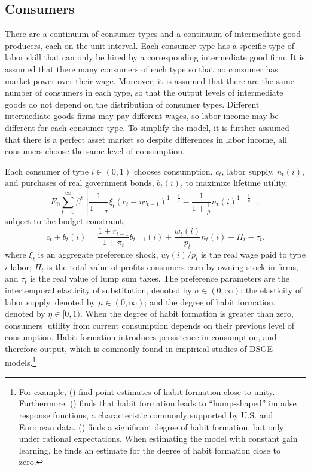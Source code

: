 \documentclass[12pt]{article}
\newcommand{\beq}{\begin{equation}}
\newcommand{\eeq}{\end{equation}}
\newcommand{\citee}[1]{\citename{#1} (\citeyear{#1})}
\begin{document}
\subsection{Consumers}
There are a continuum of consumer types and a continuum of intermediate good producers, each on the unit interval.  Each consumer type has a specific type of labor skill that can only be hired by a corresponding intermediate good firm.  It is assumed that there many consumers of each type so that no consumer has market power over their wage.  Moreover, it is assumed that there are the same number of consumers in each type, so that the output levels of intermediate goods do not depend on the distribution of consumer types.  Different intermediate goods firms may pay different wages, so labor income may be different for each consumer type.  To simplify the model, it is further assumed that there is a perfect asset market so despite differences in labor income, all consumers choose the same level of consumption.

Each consumer of type $i\in(0,1)$ chooses consumption, $c_t$, labor supply, $n_t(i)$, and purchases of real government bonds, $b_{t}(i)$, to maximize lifetime utility,
\beq \label{eq:util} E_0 \sum_{t=0}^{\infty} \beta^t \left[ \frac{1}{1-\frac{1}{\sigma}} \xi_t \left(c_t - \eta c_{t-1}\right)^{1-\frac{1}{\sigma}} - \frac{1}{1+\frac{1}{\mu}} n_t(i)^{1+\frac{1}{\mu}} \right], \eeq
subject to the budget constraint, 
\beq \label{eq:bc} c_t + b_t(i) = \frac{1+r_{t-1}}{1+\pi_t} b_{t-1}(i) + \frac{w_t(i)}{p_t} n_t(i) + \Pi_t - \tau_t. \eeq
where $\xi_t$ is an aggregate preference shock, $w_t(i)/p_t$ is the real wage paid to type $i$ labor; $\Pi_t$ is the total value of profits consumers earn by owning stock in firms, and $\tau_t$ is the real value of lump sum taxes.  The preference parameters are the intertemporal elasticity of substitution, denoted by $\sigma \in (0,\infty)$; the elasticity of labor supply, denoted by $\mu \in (0, \infty)$; and the degree of habit formation, denoted by $\eta \in [0,1)$.  When the degree of habit formation is greater than zero, consumers' utility from current consumption depends on their previous level of consumption.  Habit formation introduces persistence in consumption, and therefore output, which is commonly found in empirical studies of DSGE models.\footnote{For example, \citee{smetswouters2005} find point estimates of habit formation close to unity.  Furthermore, \citee{fuhrer2000} finds that habit formation leads to ``hump-shaped'' impulse response functions, a characteristic commonly supported by U.S. and European data.  \citee{milani2007} finds a significant degree of habit formation, but only under rational expectations.  When estimating the model with constant gain learning, he finds an estimate for the degree of habit formation close to zero.}   
\end{document}
